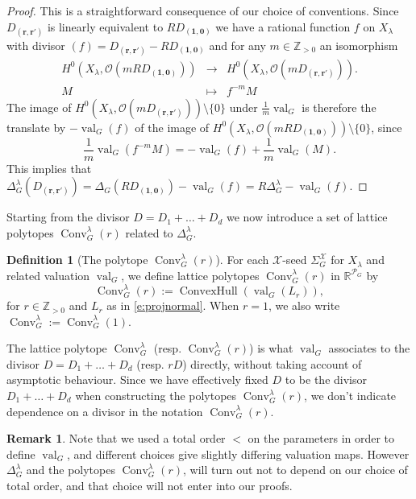 \documentclass{amsart}
\theoremstyle{definition}
\newtheorem{defn}[thm]{Definition}
\newtheorem{remark}[thm]{Remark}
\numberwithin{equation}{section}
\newcommand{\conv}{\operatorname{Conv}}
\newcommand{\Conv}{\operatorname{Conv}}
\newcommand{\NO}{\Delta}
\newcommand{\R}{\mathbb R}
\newcommand{\Z}{\mathbb{Z}}
\newcommand{\val}{{\operatorname{val}}}
\begin{document}
\begin{proof} This is a straightforward consequence of our choice of conventions. Since $D_{(\mathbf{r,r'})}$ is linearly equivalent to $R D_{(\mathbf{1,0})}$ we have a rational function $f$ on $X_\lambda$ with divisor $(f)=D_{(\mathbf{r,r'})}-RD_{(\mathbf{1,0})}$ and for any $m\in\Z_{>0}$ an isomorphism
\[
\begin{array}{ccc}
H^0(X_\lambda,\mathcal O(mRD_{(\mathbf{1,0})}))&\longrightarrow &H^0(X_\lambda,\mathcal O(mD_{(\mathbf{r,r'})})).\\
M&\mapsto & f^{-m} M
\end{array}
\]
The image of $H^0(X_\lambda,\mathcal O(mD_{(\mathbf{r,r'})}))\setminus\{0\}$ under $\frac{1}m\val_G$ is therefore the translate by $-\val_G(f)$ of the image of $H^0(X_\lambda,\mathcal O(mRD_{(\mathbf{1,0})}))\setminus\{0\}$, since  
\[\frac{1}m\val_G(f^{-m}M)=-\val_G(f)+\frac{1}{m}\val_G(M).
\]
This implies that 
$\Delta_G^\lambda(D_{(\mathbf{r,r'})})=\Delta_G(RD_{(\mathbf{1,0})})-\val_G(f)=R\Delta_G^\lambda - \val_G(f)$.
\end{proof}


Starting from the divisor $D=D_1+\dotsc+D_d$ 
we now introduce a set of lattice polytopes $\conv_G^{\lambda}(r)$ related to $\Delta^\lambda_G$. 



\begin{defn}[The polytope $\conv_G^{\lambda}(r)$]
\label{d:NOrG}  For each 
$\mathcal{X}$-seed  $\Sigma^{\mathcal X}_G$ for $X_{\lambda}$
 and related valuation $\val_G$,
we define lattice polytopes $\conv_G^{\lambda}(r)$ 
in $\R^{\mathcal P_{G}}$ by
\[
	\conv_G^{\lambda}(r):=\operatorname{ConvexHull}\left(\val_G(L_r)\right),
\]
for $r\in\Z_{>0}$ and $L_r$ as in \eqref{e:projnormal}.
	When $r=1$, we also write $\conv_G^{\lambda}:=\conv_G^{\lambda}(1)$.
\end{defn}

The lattice polytope $\conv_G^{\lambda}$ (resp. $\conv_G^{\lambda}(r)$)
is what $\val_G$ associates to the 
divisor $D=D_1+\dotsc +D_d$ (resp. $rD$) directly, 
without taking account of asymptotic behaviour.
Since we have effectively fixed $D$ to be the divisor $D_1+\dotsc +D_d$
when constructing the polytopes $\Conv_G^{\lambda}(r)$, 
we don't indicate dependence on a divisor
in the notation $\Conv_G^{\lambda}(r)$.


\begin{remark}
Note that we used a total order $<$ on the parameters in order to
define $\val_G$, and different choices give slightly differing valuation maps. However
$\NO^{\lambda}_G$ and the polytopes ${\conv}_G^{\lambda}(r)$, 
will turn out not to depend on our choice of total order, and that choice will not enter into our proofs.
\end{remark}
\end{document}
